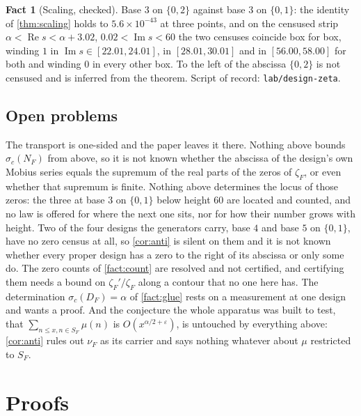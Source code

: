 \documentclass[11pt]{amsart}
\theoremstyle{definition}
\newtheorem{fact}[theorem]{Fact}
\theoremstyle{remark}
\begin{document}
\begin{fact}[Scaling, checked]
\label{fact:scaling}
Base $3$ on $\{0,2\}$ against base $3$ on $\{0,1\}$: the identity of \cref{thm:scaling} holds to $5.6 \times 10^{-43}$ at three points, and on the censused strip $\alpha < \operatorname{Re} s < \alpha + 3.02$, $0.02 < \operatorname{Im} s < 60$ the two censuses coincide box for box, winding $1$ in $\operatorname{Im} s \in [22.01, 24.01]$, in $[28.01, 30.01]$ and in $[56.00, 58.00]$ for both and winding $0$ in every other box. To the left of the abscissa $\{0,2\}$ is not censused and is inferred from the theorem. Script of record: \texttt{lab/design-zeta}.
\end{fact}

\subsection{Open problems}
\label{sub:open}

The transport is one-sided and the paper leaves it there. Nothing above bounds $\sigma_{c}(N_{F})$ from above, so it is not known whether the abscissa of the design's own Mobius series equals the supremum of the real parts of the zeros of $\zeta_{F}$, or even whether that supremum is finite. Nothing above determines the locus of those zeros: the three at base $3$ on $\{0,1\}$ below height $60$ are located and counted, and no law is offered for where the next one sits, nor for how their number grows with height. Two of the four designs the generators carry, base $4$ and base $5$ on $\{0,1\}$, have no zero census at all, so \cref{cor:anti} is silent on them and it is not known whether every proper design has a zero to the right of its abscissa or only some do. The zero counts of \cref{fact:count} are resolved and not certified, and certifying them needs a bound on $\zeta_{F}'/\zeta_{F}$ along a contour that no one here has. The determination $\sigma_{c}(D_{F}) = \alpha$ of \cref{fact:glue} rests on a measurement at one design and wants a proof. And the conjecture the whole apparatus was built to test, that $\sum_{n \le x, n \in S_{F}} \mu(n)$ is $O(x^{\alpha/2 + \varepsilon})$, is untouched by everything above: \cref{cor:anti} rules out $\nu_{F}$ as its carrier and says nothing whatever about $\mu$ restricted to $S_{F}$.

\section{Proofs}
\label{sec:proofs}
\end{document}
